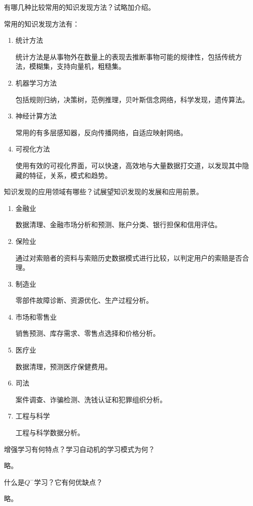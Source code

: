 \begin{question}
有哪几种比较常用的知识发现方法？试略加介绍。
\end{question}
\begin{solution}
常用的知识发现方法有：
	\begin{enumerate}
		\item 统计方法 \par
		统计方法是从事物外在数量上的表现去推断事物可能的规律性，包括传统方法，模糊集，支持向量机，粗糙集。
		\item 机器学习方法 \par
		包括规则归纳，决策树，范例推理，贝叶斯信念网络，科学发现，遗传算法。
		\item 神经计算方法 \par
		常用的有多层感知器，反向传播网络，自适应映射网络。
		\item 可视化方法 \par
		使用有效的可视化界面，可以快速，高效地与大量数据打交道，以发现其中隐藏的特征，关系，模式和趋势。
	\end{enumerate}
\end{solution}

\begin{question}
知识发现的应用领域有哪些？试展望知识发现的发展和应用前景。
\end{question}
\begin{solution}
	\begin{enumerate}
		\item 金融业 \par
		数据清理、金融市场分析和预测、账户分类、银行担保和信用评估。
		\item 保险业 \par
		通过对索赔者的资料与索赔历史数据模式进行比较，以判定用户的索赔是否合理。
		\item 制造业 \par
		零部件故障诊断、资源优化、生产过程分析。
		\item 市场和零售业 \par
		销售预测、库存需求、零售点选择和价格分析。
		\item 医疗业 \par
		数据清理，预测医疗保健费用。
		\item 司法 \par
		案件调查、诈骗检测、洗钱认证和犯罪组织分析。
		\item 工程与科学 \par
		工程与科学数据分析。
	\end{enumerate}
\end{solution}

\begin{question}
增强学习有何特点？学习自动机的学习模式为何？
\end{question}
\begin{solution}
略。
\end{solution}

\begin{question}
什么是$Q^-$学习？它有何优缺点？
\end{question}
\begin{solution}
略。
\end{solution}